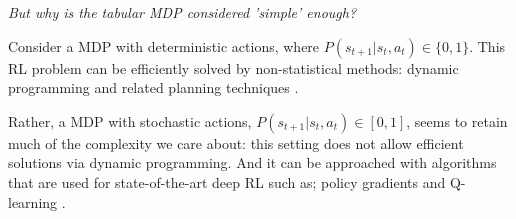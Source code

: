 \begin{displayquote}
\textit{But why is the tabular MDP considered 'simple' enough?}
\end{displayquote}

Consider a MDP with deterministic actions, where $P(s_{t+1}|s_t, a_t) \in \{ 0, 1\}$.
This RL problem can be efficiently solved by non-statistical
methods: dynamic programming and related planning techniques \cite{Bertsekas1995}.

Rather, a MDP with stochastic actions, $P(s_{t+1}|s_t, a_t) \in [0, 1]$,
seems to retain much of the complexity we care about: this setting does not allow
efficient solutions via dynamic programming. And it can be approached with algorithms
that are used for state-of-the-art deep RL such as;
policy gradients \cite{Schulman2015a} and Q-learning \cite{Mnih2015}.
